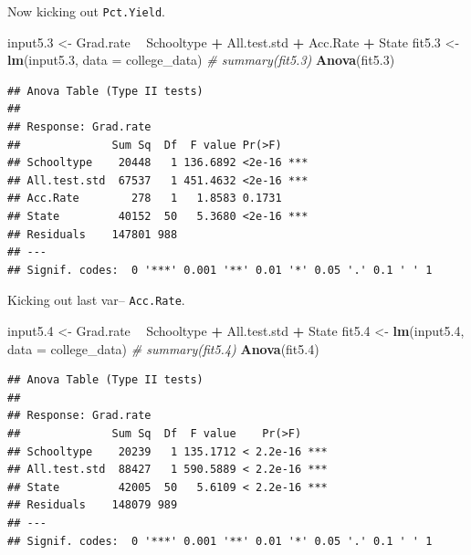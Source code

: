 \documentclass[]{article}
\newenvironment{Shaded}{\begin{snugshade}}{\end{snugshade}}
\newcommand{\KeywordTok}[1]{\textcolor[rgb]{0.13,0.29,0.53}{\textbf{#1}}}
\newcommand{\DataTypeTok}[1]{\textcolor[rgb]{0.13,0.29,0.53}{#1}}
\newcommand{\DecValTok}[1]{\textcolor[rgb]{0.00,0.00,0.81}{#1}}
\newcommand{\StringTok}[1]{\textcolor[rgb]{0.31,0.60,0.02}{#1}}
\newcommand{\CommentTok}[1]{\textcolor[rgb]{0.56,0.35,0.01}{\textit{#1}}}
\newcommand{\OperatorTok}[1]{\textcolor[rgb]{0.81,0.36,0.00}{\textbf{#1}}}
\newcommand{\NormalTok}[1]{#1}
\begin{document}
Now kicking out \texttt{Pct.Yield}.

\begin{Shaded}
\begin{Highlighting}[]
\NormalTok{input5.}\DecValTok{3}\NormalTok{ <-}\StringTok{ }\NormalTok{Grad.rate }\OperatorTok{~}\StringTok{ }\NormalTok{Schooltype }\OperatorTok{+}\StringTok{ }\NormalTok{All.test.std }\OperatorTok{+}\StringTok{ }\NormalTok{Acc.Rate }\OperatorTok{+}\StringTok{ }\NormalTok{State}
\NormalTok{fit5.}\DecValTok{3}\NormalTok{ <-}\StringTok{ }\KeywordTok{lm}\NormalTok{(input5.}\DecValTok{3}\NormalTok{, }\DataTypeTok{data =}\NormalTok{ college_data)}
\CommentTok{# summary(fit5.3)}
\KeywordTok{Anova}\NormalTok{(fit5.}\DecValTok{3}\NormalTok{)}
\end{Highlighting}
\end{Shaded}

\begin{verbatim}
## Anova Table (Type II tests)
## 
## Response: Grad.rate
##              Sum Sq  Df  F value Pr(>F)    
## Schooltype    20448   1 136.6892 <2e-16 ***
## All.test.std  67537   1 451.4632 <2e-16 ***
## Acc.Rate        278   1   1.8583 0.1731    
## State         40152  50   5.3680 <2e-16 ***
## Residuals    147801 988                    
## ---
## Signif. codes:  0 '***' 0.001 '**' 0.01 '*' 0.05 '.' 0.1 ' ' 1
\end{verbatim}

Kicking out last var-- \texttt{Acc.Rate}.

\begin{Shaded}
\begin{Highlighting}[]
\NormalTok{input5.}\DecValTok{4}\NormalTok{ <-}\StringTok{ }\NormalTok{Grad.rate }\OperatorTok{~}\StringTok{ }\NormalTok{Schooltype }\OperatorTok{+}\StringTok{ }\NormalTok{All.test.std }\OperatorTok{+}\StringTok{ }\NormalTok{State}
\NormalTok{fit5.}\DecValTok{4}\NormalTok{ <-}\StringTok{ }\KeywordTok{lm}\NormalTok{(input5.}\DecValTok{4}\NormalTok{, }\DataTypeTok{data =}\NormalTok{ college_data)}
\CommentTok{# summary(fit5.4)}
\KeywordTok{Anova}\NormalTok{(fit5.}\DecValTok{4}\NormalTok{)}
\end{Highlighting}
\end{Shaded}

\begin{verbatim}
## Anova Table (Type II tests)
## 
## Response: Grad.rate
##              Sum Sq  Df  F value    Pr(>F)    
## Schooltype    20239   1 135.1712 < 2.2e-16 ***
## All.test.std  88427   1 590.5889 < 2.2e-16 ***
## State         42005  50   5.6109 < 2.2e-16 ***
## Residuals    148079 989                       
## ---
## Signif. codes:  0 '***' 0.001 '**' 0.01 '*' 0.05 '.' 0.1 ' ' 1
\end{verbatim}
\end{document}
